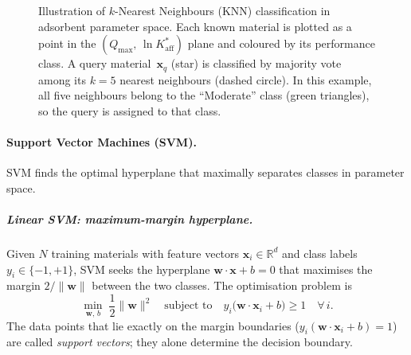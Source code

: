 \begin{figure}[H]
		\caption{Illustration of $k$-Nearest Neighbours (KNN)
			classification in adsorbent parameter space.
			Each known material is plotted as a point in the
			$(Q_{\max},\, \ln K_{\mathrm{aff}}^{\ast})$ plane and
			coloured by its performance class.
			A query material~$\mathbf{x}_q$ (star) is classified by
			majority vote among its $k = 5$ nearest neighbours
			(dashed circle).  In this example, all five neighbours
			belong to the ``Moderate'' class (green triangles), so
			the query is assigned to that class.}
		\label{fig:KNN_illustration}
	\end{figure}

	\paragraph{Support Vector Machines (SVM).}
	SVM finds the optimal hyperplane that maximally separates classes
	in parameter space.

	\subparagraph{Linear SVM: maximum-margin hyperplane.}
	Given $N$ training materials with feature vectors
	$\mathbf{x}_i \in \mathbb{R}^d$ and class labels
	$y_i \in \{-1,+1\}$, SVM seeks the hyperplane
	$\mathbf{w}\cdot\mathbf{x} + b = 0$ that maximises the margin
	$2/\|\mathbf{w}\|$ between the two classes.
	The optimisation problem is
	\begin{equation}
		\min_{\mathbf{w},\,b}\;
		\frac{1}{2}\|\mathbf{w}\|^2
		\quad\text{subject to}\quad
		y_i\bigl(\mathbf{w}\cdot\mathbf{x}_i + b\bigr) \ge 1
		\quad \forall\, i.
		\label{eq:SVM_hard}
	\end{equation}
	The data points that lie exactly on the margin boundaries
	($y_i(\mathbf{w}\cdot\mathbf{x}_i + b) = 1$) are called
	\emph{support vectors}; they alone determine the decision
	boundary.

